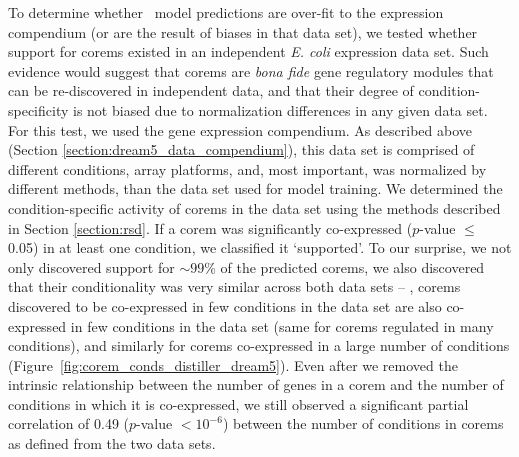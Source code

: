 To determine whether \egrine\ model predictions are over-fit to the  expression compendium (or are the result of biases in that data set), we tested whether support for corems existed in an independent {\it E. coli} expression data set. Such evidence would suggest that corems are \textit{bona fide} gene regulatory modules that can be re-discovered in independent data, and that their degree of condition-specificity is not biased due to normalization differences in any given data set. For this test, we used the  gene expression compendium. As described above (Section \ref{section:dream5_data_compendium}), this data set is comprised of different conditions, array platforms, and, most important, was normalized by different methods, than the  data set used for model training. We determined the condition-specific activity of corems in the  data set using the methods described in Section \ref{section:rsd}. If a corem was significantly co-expressed ($p$-value $\leq$ 0.05) in at least one condition, we classified it `supported'. To our surprise, we not only discovered support for $\sim 99$\% of the predicted corems, we also discovered that their conditionality was very similar across both data sets -- \ie, corems discovered to be co-expressed in few conditions in the  data set are also co-expressed in few conditions in the  data set (same for corems regulated in many conditions), and similarly for corems co-expressed in a large number of conditions (Figure~\ref{fig:corem_conds_distiller_dream5}). Even after we removed the intrinsic relationship between the number of genes in a corem and the number of conditions in which it is co-expressed, we still observed a significant partial correlation of 0.49 ($p$-value $< 10^{-6}$) between the number of conditions in corems as defined from the two data sets.

